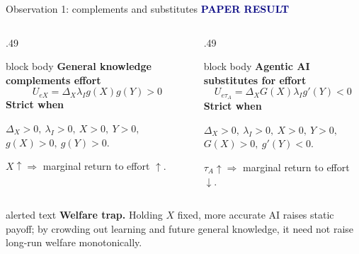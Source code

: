 \documentclass[aspectratio=169,10pt]{beamer}
\newcommand{\paperlabel}{\textcolor{Navy}{\scriptsize\bfseries PAPER RESULT}}
\begin{document}
\begin{frame}{Observation 1: complements and substitutes}
  \paperlabel
  \vspace{.15cm}

  \begin{columns}[T,onlytextwidth]
    \begin{column}{.49\textwidth}
      \begin{beamercolorbox}[rounded=true,sep=.65em]{block body}
        \centering\textbf{General knowledge complements effort}
        \[
          \boxed{U_{eX}=\Delta_X\lambda_I g(X)g(Y)>0}
        \]
        \scriptsize\textbf{Strict when}\par
        $\Delta_X>0,\ \lambda_I>0,\ X>0,\ Y>0,$\\
        $g(X)>0,\ g(Y)>0.$

        \vspace{.12cm}
        \footnotesize $X\uparrow\Rightarrow$ marginal return to effort $\uparrow$.
      \end{beamercolorbox}
    \end{column}
    \begin{column}{.49\textwidth}
      \begin{beamercolorbox}[rounded=true,sep=.65em]{block body}
        \centering\textbf{Agentic AI substitutes for effort}
        \[
          \boxed{U_{e\tau_A}=\Delta_XG(X)\lambda_Ig'(Y)<0}
        \]
        \scriptsize\textbf{Strict when}\par
        $\Delta_X>0,\ \lambda_I>0,\ X>0,\ Y>0,$\\
        $G(X)>0,\ g'(Y)<0.$

        \vspace{.12cm}
        \footnotesize $\tau_A\uparrow\Rightarrow$ marginal return to effort $\downarrow$.
      \end{beamercolorbox}
    \end{column}
  \end{columns}

  \vspace{.25cm}
  \begin{beamercolorbox}[rounded=true,sep=.6em]{alerted text}
    \small\textbf{Welfare trap.} Holding $X$ fixed, more accurate AI raises
    static payoff; by crowding out learning and future general knowledge, it need
    not raise long-run welfare monotonically.
  \end{beamercolorbox}
\end{frame}
\end{document}
